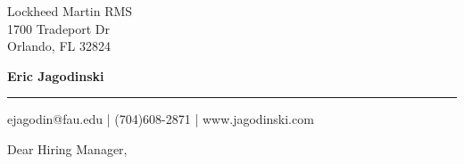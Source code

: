 \documentclass[11pt]{letter} %
\begin{document}

\begin{letter}{Lockheed Martin RMS\\
1700 Tradeport Dr \\
Orlando, FL 32824
}

\begin{center}
\huge\bf Eric Jagodinski \\ %
\vspace{10pt} \hrule height 1pt %
\end{center} 

\begin{center}
\large%
ejagodin@fau.edu | (704)608-2871 | www.jagodinski.com %
\end{center} 




\opening{Dear Hiring Manager,} 
 
 


\end{letter}
\end{document}
